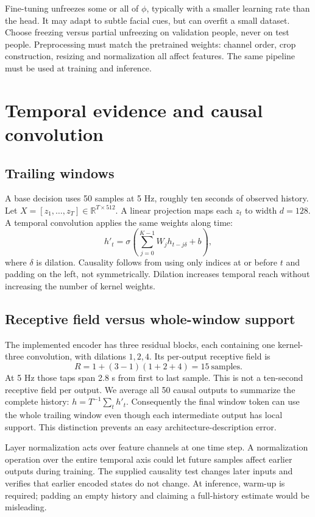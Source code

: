 \documentclass[10pt,a4paper]{article}
\newcommand{\R}{\mathbb{R}}
\begin{document}
Fine-tuning unfreezes some or all of $\phi$, typically with a smaller learning rate than the head. It may adapt to subtle facial cues, but can overfit a small dataset. Choose freezing versus partial unfreezing on validation people, never on test people. Preprocessing must match the pretrained weights: channel order, crop construction, resizing and normalization all affect features. The same pipeline must be used at training and inference.

\section{Temporal evidence and causal convolution}
\subsection{Trailing windows}
A base decision uses 50 samples at 5 Hz, roughly ten seconds of observed history. Let $X=[z_1,\ldots,z_T]\in\R^{T\times512}$. A linear projection maps each $z_t$ to width $d=128$. A temporal convolution applies the same weights along time:
\begin{equation}
h'_t=\sigma\!\left(\sum_{j=0}^{K-1}W_j h_{t-j\delta}+b\right),
\end{equation}
where $\delta$ is dilation. Causality follows from using only indices at or before $t$ and padding on the left, not symmetrically. Dilation increases temporal reach without increasing the number of kernel weights.

\subsection{Receptive field versus whole-window support}
The implemented encoder has three residual blocks, each containing one kernel-three convolution, with dilations $1,2,4$. Its per-output receptive field is
\begin{equation}
R=1+(3-1)(1+2+4)=15\ \text{samples}.
\end{equation}
At 5 Hz those taps span 2.8 s from first to last sample. This is not a ten-second receptive field per output. We average all 50 causal outputs to summarize the complete history: $h=T^{-1}\sum_t h'_t$. Consequently the final window token can use the whole trailing window even though each intermediate output has local support. This distinction prevents an easy architecture-description error.

Layer normalization acts over feature channels at one time step. A normalization operation over the entire temporal axis could let future samples affect earlier outputs during training. The supplied causality test changes later inputs and verifies that earlier encoded states do not change. At inference, warm-up is required; padding an empty history and claiming a full-history estimate would be misleading.
\end{document}
